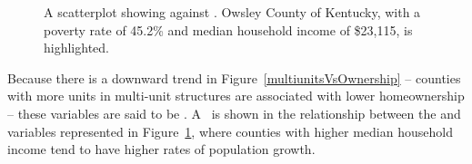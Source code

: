 

\begin{figure}
  \centering
  \caption{A scatterplot showing
      against .
      Owsley County of Kentucky, with a poverty rate of 45.2\%
      and median household income of \$23,115, is highlighted.}
  \label{pop_change_v_med_income}
\end{figure}

Because there is a downward trend in
Figure~\ref{multiunitsVsOwnership} --
counties with more units in multi-unit structures
are associated with lower homeownership --
these variables are said to be
.
A~ is shown in the relationship
between the
and 
variables represented in Figure~\ref{pop_change_v_med_income},
where counties with higher median household income tend
to have higher rates of population growth.


